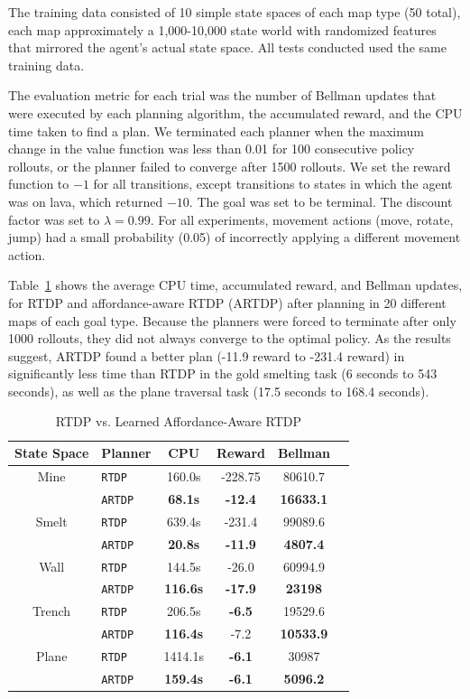 \documentclass[conference]{IEEEtran}
\begin{document}
The training data consisted of 10 simple state spaces of each map type
(50 total), each map approximately a 1,000-10,000 state world with
randomized features that mirrored the agent's actual state space. All tests
conducted used the same training data.

The evaluation metric for each trial was the number of Bellman updates
that were executed by each planning algorithm, the accumulated reward,
and the CPU time taken to find a plan.  We terminated each planner
when the maximum change in the value function was less than 0.01 for
100 consecutive policy rollouts, or the planner failed to converge
after 1500 rollouts.  We set the reward function to $-1$ for all
transitions, except transitions to states in which the agent was on
lava, which returned $-10$. The goal was set to be terminal. The
discount factor was set to $\lambda = 0.99$. For all experiments,
movement actions (move, rotate, jump) had a small probability (0.05)
of incorrectly applying a different movement action.

Table~\ref{table:minecraft_results} shows the average CPU time, accumulated reward, and Bellman updates, 
for RTDP and affordance-aware RTDP (ARTDP) after planning in 20 different maps of each goal type. Because the planners were forced to terminate after only 1000 rollouts, they did not always converge to the optimal policy. 
As the results suggest, ARTDP found a better plan (-11.9 reward to -231.4 reward) in significantly less time than 
RTDP in the gold smelting task (6 seconds to 543 seconds), as well as the plane 
traversal task (17.5 seconds to 168.4 seconds).

\begin{table}[H]
\centering
\caption{RTDP vs. Learned Affordance-Aware RTDP}
\begin{tabular}{ c l  || c c c c}
  State Space	&	Planner 				&	CPU	&	Reward 	& Bellman \\ \hline
  Mine 	& \texttt{RTDP}  			& 	160.0s	&	-228.75	&	80610.7		\\
  		& \texttt{ARTDP}  			& 	{\bf 68.1s}	&	{\bf -12.4}	&	{\bf 16633.1}		\\  \hline
  Smelt	&	\texttt{RTDP}  			& 	639.4s	&	-231.4	&	99089.6		\\
  		&	\texttt{ARTDP}  		& 	{\bf 20.8s}	&	{\bf -11.9}	&	{\bf 4807.4}		\\  \hline
  Wall	&	\texttt{RTDP}  			& 	144.5s	&	-26.0		&	60994.9		\\
  		&	\texttt{ARTDP}  		& 	{\bf 116.6s}&	{\bf -17.9}	&	{\bf 23198}		\\  \hline
  Trench	&	\texttt{RTDP}  			& 	206.5s	&	{\bf -6.5}	&	19529.6		\\
  		&	\texttt{ARTDP}  		& 	{\bf 116.4s}&	-7.2		&	{\bf 10533.9}		\\ \hline
Plane	&	\texttt{RTDP}  			& 	1414.1s	&	{\bf -6.1}	&	30987		\\
  		&	\texttt{ARTDP}  		& 	{\bf 159.4s}&	{\bf -6.1}	&	{\bf 5096.2}		\\ 
\end{tabular}
\label{table:minecraft_results}
\end{table}
\end{document}
